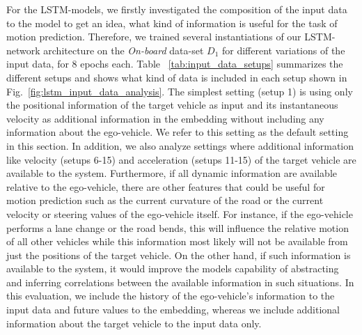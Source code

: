 For the \ac{LSTM}-models, we firstly investigated the composition of the input data to the model to get an idea, what kind of information is useful for the task of motion prediction.
Therefore, we trained several instantiations of our \ac{LSTM}-network architecture on the \emph{On-board} data-set $D_1$ for different variations of the input data, for \num{8} epochs each.
Table ~\ref{tab:input_data_setups} summarizes the different setups and shows what kind of data is included in each setup shown in Fig.~\ref{fig:lstm_input_data_analysis}.
The simplest setting (setup \num{1}) is using only the positional information of the target vehicle as input and its instantaneous velocity as additional information in the embedding without including any information about the ego-vehicle.
We refer to this setting as the default setting in this section.
In addition, we also analyze settings where additional information like velocity (setups \num{6}-\num{15}) and acceleration (setups \num{11}-\num{15}) of the target vehicle are available to the system.
Furthermore, if all dynamic information are available relative to the ego-vehicle, there are other features that could be useful for motion prediction such as the current curvature of the road or the current velocity or steering values of the ego-vehicle itself.
For instance, if the ego-vehicle performs a lane change or the road bends, this will influence the relative motion of all other vehicles while this information most likely will not be available from just the positions of the target vehicle. 
On the other hand, if such information is available to the system, it would improve the models capability of abstracting and inferring correlations between the available information in such situations.
In this evaluation, we include the history of the ego-vehicle's information to the input data and future values to the embedding, whereas we include additional information about the target vehicle to the input data only. 


